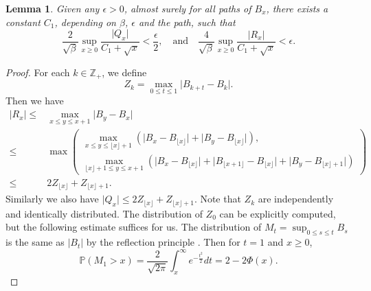 \documentclass[11pt, a4paper]{article}
\numberwithin{equation}{section}
\newcommand{\intZ}{\mathbb{Z}}
\newcommand{\Prob}{\mathbb{P}}
\newtheorem{lem}{Lemma}
\theoremstyle{definition}
\theoremstyle{remark}
\begin{document}
\begin{lem} \label{lem:est_Brownian_path}
  Given any $\epsilon > 0$, almost surely for all paths of $B_x$, there exists a constant $C_1$, depending on $\beta$, $\epsilon$ and the path, such that
  \begin{equation} \label{eq:est_Brownian_path}
    \frac{2}{\sqrt{\beta}} \sup_{x \geq 0} \frac{\lvert Q_x \rvert}{C_1 + \sqrt{x}} < \frac{\epsilon}{2}, \quad \text{and} \quad \frac{4}{\sqrt{\beta}} \sup_{x \geq 0} \frac{\lvert R_x \rvert}{C_1 + \sqrt{x}} < \epsilon.
  \end{equation}
\end{lem}
\begin{proof}
  For each $k \in \intZ_+$, we define
  \begin{equation}
    Z_k = \max_{0 \leq t \leq 1} \lvert B_{k + t} - B_k \rvert.
  \end{equation}
  Then we have
  \begin{equation}
    \begin{split}
      \lvert R_x \rvert \leq {}& \max_{x \leq y \leq x + 1} \lvert B_y - B_x \rvert \\
      \leq {}& \max \left(
        \begin{gathered}
          \max_{x \leq y \leq \lfloor x \rfloor + 1} (\lvert B_x - B_{\lfloor x \rfloor} \rvert + \lvert B_y - B_{\lfloor x \rfloor} \rvert), \\
          \max_{\lfloor x \rfloor + 1 \leq y \leq x + 1} (\lvert B_x - B_{\lfloor x \rfloor} \rvert + \lvert B_{\lfloor x + 1 \rfloor} - B_{\lfloor x \rfloor} \rvert + \lvert B_y - B_{\lfloor x \rfloor + 1} \lvert)
        \end{gathered}
      \right) \\
      \leq {}& 2Z_{\lfloor x \rfloor} + Z_{\lfloor x \rfloor + 1}.
    \end{split}
  \end{equation}
  Similarly we also have $\lvert Q_x \rvert \leq 2Z_{\lfloor x \rfloor} + Z_{\lfloor x \rfloor + 1}$.  Note that $Z_k$ are independently and identically distributed. The distribution of $Z_0$ can be explicitly computed, but the following estimate suffices for us. The distribution of $M_t = \sup_{0 \leq s \leq t} B_s$ is the same as $\lvert B_t \rvert$ by the reflection principle \cite[Example 8.4.1]{Durrett10}. Then for $t = 1$ and $x \geq 0$,
  \begin{equation}
    \Prob(M_1 > x) = \frac{2}{\sqrt{2\pi}} \int^{\infty}_x e^{-\frac{t^2}{2}} dt = 2 - 2 \Phi(x).
  \end{equation}

\end{proof}
\end{document}
